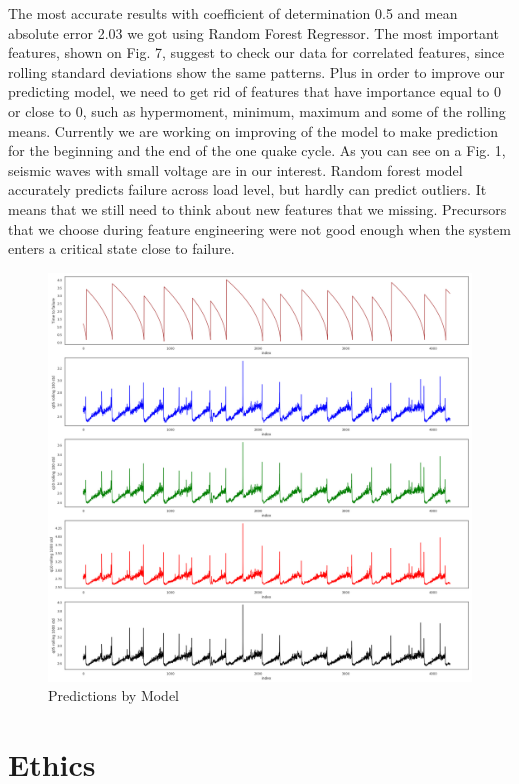 \documentclass[]{llncs} %
\begin{document}
The most accurate results with coefficient of determination 0.5 and mean absolute error 2.03 we got using Random Forest Regressor. The most important features, shown on Fig. 7, suggest to check our data for correlated features, since rolling standard deviations show the same patterns. Plus in order to improve our predicting model, we need to get rid of features that have importance equal to 0 or close to 0, such as hypermoment, minimum, maximum and some of the rolling means. Currently we are working on improving of the model to make prediction for the beginning and the end of the one quake cycle. As you can see on a Fig. 1, seismic waves with small voltage are in our interest. Random forest model accurately predicts failure across load level, but hardly can predict outliers. It means that we still need to think about new features that we missing. Precursors that we choose during feature engineering were not good enough when the system enters a critical state close to failure.
\begin{figure}
	\centering
	\includegraphics[width=1\linewidth]{../GPUProject/Analysis1.png}
	\caption{Predictions by Model}
	\label{fig:morethan90percent}
\end{figure}

\section{Ethics}
\end{document}
